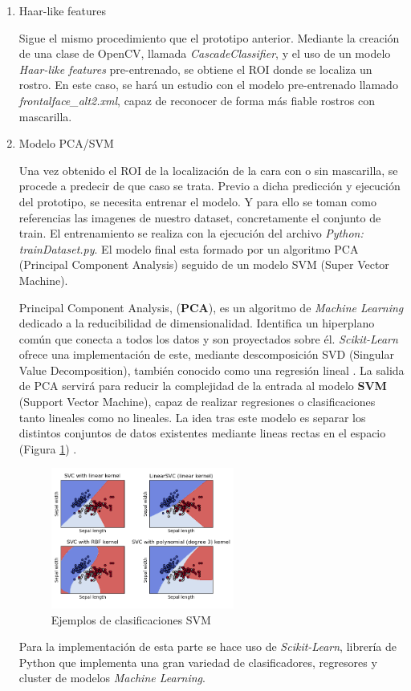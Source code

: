 \begin{enumerate}
	\item Haar-like features
	
	Sigue el mismo procedimiento que el prototipo anterior. Mediante la creación de una clase de OpenCV, llamada \textit{CascadeClassifier}, y el uso de un modelo \textit{Haar-like features} pre-entrenado, se obtiene el ROI donde se localiza un rostro. En este caso, se hará un estudio con el modelo pre-entrenado llamado \textit{frontalface\_alt2.xml}, capaz de reconocer de forma más fiable rostros con mascarilla. 
	
	\item Modelo PCA/SVM
	
	Una vez obtenido el ROI de la localización de la cara con o sin mascarilla, se procede a predecir de que caso se trata. Previo a dicha predicción y ejecución del prototipo, se necesita entrenar el modelo. Y para ello se toman como referencias las imagenes de nuestro dataset, concretamente el conjunto de train. El entrenamiento se realiza con la ejecución del archivo \textit{Python: trainDataset.py}. El modelo final esta formado por un algoritmo PCA (Principal Component Analysis) seguido de un modelo SVM (Super Vector Machine).
	
	Principal Component Analysis, (\textbf{PCA}), es un algoritmo de \textit{Machine Learning} dedicado a la reducibilidad de dimensionalidad. Identifica un hiperplano común que conecta a todos los datos y son proyectados sobre él. \textit{Scikit-Learn} ofrece una implementación de este, mediante descomposición SVD (Singular Value Decomposition), también conocido como una regresión lineal \cite{geron_2020}. La salida de PCA servirá para reducir la complejidad de la entrada al modelo \textbf{SVM} (Support Vector Machine), capaz de realizar regresiones o clasificaciones tanto lineales como no lineales. La idea tras este modelo es separar los distintos conjuntos de datos existentes mediante lineas rectas en el espacio (Figura \ref{fig:svm}) \cite{geron_2020}.
	
	\begin{figure}[htp]
		\centering
		\includegraphics[width=6cm]{imagenes/svm_example.png}
		\caption{Ejemplos de clasificaciones SVM}
		\label{fig:svm}
	\end{figure}

	Para la implementación de esta parte se hace uso de \textit{Scikit-Learn}, librería de Python que implementa una gran variedad de clasificadores, regresores y cluster de modelos \textit{Machine Learning}.
\end{enumerate}


